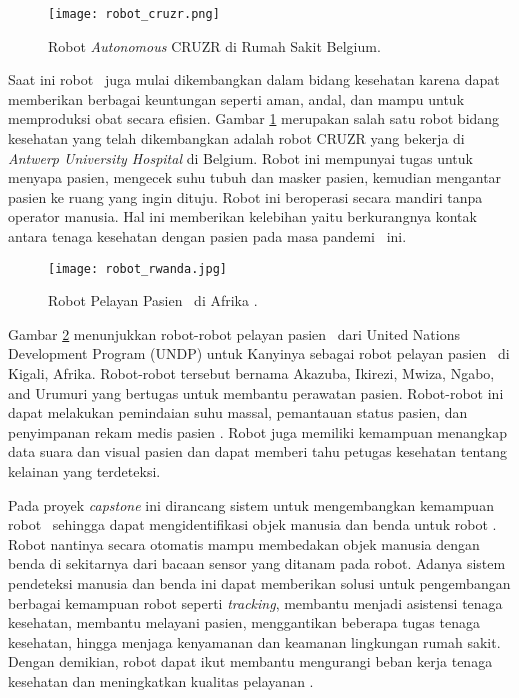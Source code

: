 \begin{figure}[H]
    \centering
    \texttt{[image: robot\_cruzr.png]}
    \caption{Robot \textit{Autonomous} CRUZR di Rumah Sakit Belgium\cite{a9}.}
    \label{fig:Ch02_robot_CRUZR}
\end{figure}

Saat ini robot \auto\ juga mulai dikembangkan dalam bidang kesehatan karena dapat memberikan berbagai keuntungan seperti aman, andal, dan mampu untuk memproduksi obat secara efisien\cite{a8}. Gambar \ref{fig:Ch02_robot_CRUZR} merupakan salah satu robot bidang kesehatan yang telah dikembangkan adalah robot CRUZR yang bekerja di \textit{Antwerp University Hospital} di Belgium\cite{a9}. Robot ini mempunyai tugas untuk menyapa pasien, mengecek suhu tubuh dan masker pasien, kemudian mengantar pasien ke ruang yang ingin dituju. Robot ini beroperasi secara mandiri tanpa operator manusia. Hal ini memberikan kelebihan yaitu berkurangnya kontak antara tenaga kesehatan dengan pasien pada masa pandemi \covid\ ini.

\begin{figure}[H]
    \centering
    \texttt{[image: robot\_rwanda.jpg]}
    \caption{Robot Pelayan Pasien \covid\ di Afrika \cite{a10}.}
    \label{fig:Ch02_robot_rwanda}
\end{figure}
    

Gambar \ref*{fig:Ch02_robot_rwanda} menunjukkan robot-robot pelayan pasien \covid\ dari United Nations Development Program (UNDP) untuk Kanyinya sebagai robot pelayan pasien \covid\ di Kigali, Afrika. Robot-robot tersebut bernama Akazuba, Ikirezi, Mwiza, Ngabo, and Urumuri yang bertugas untuk membantu perawatan pasien. Robot-robot ini dapat melakukan pemindaian suhu massal, pemantauan status pasien, dan penyimpanan rekam medis pasien \covid. Robot juga memiliki kemampuan menangkap data suara dan visual pasien dan dapat memberi tahu petugas kesehatan tentang kelainan yang terdeteksi.

Pada proyek \textit{capstone} ini dirancang sistem untuk mengembangkan kemampuan robot \covid\ sehingga dapat mengidentifikasi objek manusia dan benda untuk robot \covid. Robot nantinya secara otomatis mampu membedakan objek manusia dengan benda di sekitarnya dari bacaan sensor yang ditanam pada robot. Adanya sistem pendeteksi manusia dan benda ini dapat memberikan solusi untuk pengembangan berbagai kemampuan robot seperti \textit{tracking}, membantu menjadi asistensi tenaga kesehatan, membantu melayani pasien, menggantikan beberapa tugas tenaga kesehatan, hingga menjaga kenyamanan dan keamanan lingkungan rumah sakit. Dengan demikian, robot dapat ikut membantu mengurangi beban kerja tenaga kesehatan dan meningkatkan kualitas pelayanan \covid.


